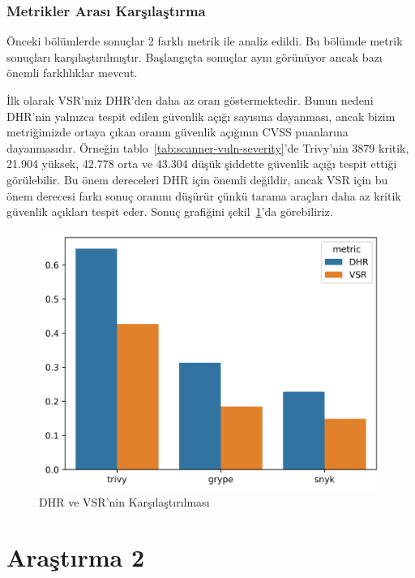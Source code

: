 \subsection{Metrikler Arası Karşılaştırma}\label{subsec:ComparisonBetweenMetrics}

Önceki bölümlerde sonuçlar 2 farklı metrik ile analiz edildi. Bu bölümde metrik sonuçları karşılaştırılmıştır. Başlangıçta sonuçlar aynı görünüyor ancak bazı önemli farklılıklar mevcut.

İlk olarak VSR'miz DHR'den daha az oran göstermektedir. Bunun nedeni DHR'nin yalnızca tespit edilen güvenlik açığı sayısına dayanması, ancak bizim metriğimizde ortaya çıkan oranın güvenlik açığının CVSS puanlarına dayanmasıdır. Örneğin tablo~\ref{tab:scanner-vuln-severity}'de Trivy'nin 3879 kritik, 21.904 yüksek, 42.778 orta ve 43.304 düşük şiddette güvenlik açığı tespit ettiği görülebilir. Bu önem dereceleri DHR için önemli değildir, ancak VSR için bu önem derecesi farkı sonuç oranını düşürür çünkü tarama araçları daha az kritik güvenlik açıkları tespit eder. Sonuç grafiğini şekil~\ref{fig:comparison-dhr-vsr}'da görebiliriz.

\begin{figure}[!htbp]
    \centering
    \includegraphics[width=1\linewidth]{images/s1/comparison-dhr-vsr.png}
    \caption{DHR ve VSR'nin Karşılaştırılması}\label{fig:comparison-dhr-vsr}
\end{figure}

\chapter{Araştırma 2}\label{ch:arastirma2}
\vspace{12pt}

